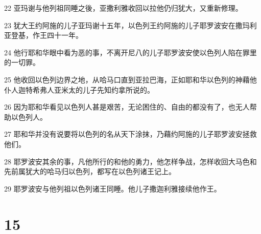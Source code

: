 \par 22 亚玛谢与他列祖同睡之後，亚撒利雅收回以拉他仍归犹大，又重新修理。
\par 23 犹大王约阿施的儿子亚玛谢十五年，以色列王约阿施的儿子耶罗波安在撒玛利亚登基，作王四十一年。
\par 24 他行耶和华眼中看为恶的事，不离开尼八的儿子耶罗波安使以色列人陷在罪里的一切罪。
\par 25 他收回以色列边界之地，从哈马口直到亚拉巴海，正如耶和华以色列的神藉他仆人迦特希弗人亚米太的儿子先知约拿所说的。
\par 26 因为耶和华看见以色列人甚是艰苦，无论困住的、自由的都没有了，也无人帮助以色列人。
\par 27 耶和华并没有说要将以色列的名从天下涂抹，乃藉约阿施的儿子耶罗波安拯救他们。
\par 28 耶罗波安其余的事，凡他所行的和他的勇力，他怎样争战，怎样收回大马色和先前属犹大的哈马归以色列，都写在以色列诸王记上。
\par 29 耶罗波安与他列祖以色列诸王同睡。他儿子撒迦利雅接续他作王。

\chapter{15}

